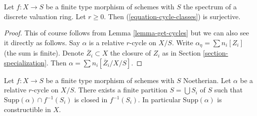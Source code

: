 \begin{lemma}
\label{lemma-get-cycles-dvr}
Let $f : X \to S$ be a finite type morphism of schemes with $S$
the spectrum of a discrete valuation ring. Let $r \geq 0$.
Then (\ref{equation-cycle-classes}) is surjective.
\end{lemma}

\begin{proof}
This of course follows from Lemma \ref{lemma-get-cycles} but we can
also see it directly as follows. Say $\alpha$ is a relative $r$-cycle
on $X/S$. Write $\alpha_\eta = \sum n_i[Z_i]$ (the sum is finite). Denote
$\overline{Z}_i \subset X$ the closure of $Z_i$ as in
Section \ref{section-specialization}. Then
$\alpha = \sum n_i[\overline{Z}_i/X/S]$.
\end{proof}

\begin{lemma}
\label{lemma-relative-cycle-support-stratification}
Let $f : X \to S$ be a finite type morphism of schemes with $S$ Noetherian.
Let $\alpha$ be a relative $r$-cycle on $X/S$. There exists
a finite partition $S = \bigcup S_i$ of $S$ such that
$\text{Supp}(\alpha) \cap f^{-1}(S_i)$ is closed in $f^{-1}(S_i)$.
In particular $\text{Supp}(\alpha)$ is constructible in $X$.
\end{lemma}


